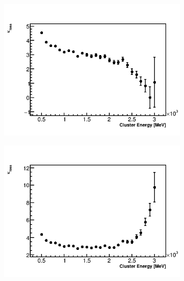 \begin{landscape}
\begin{figure}[h]
    \begin{subfigure}[t]{0.4\textwidth}
        \centering
        \includegraphics[width=\textwidth]{TMethod_kappa_loss_Vs_EBin_Canv_EG-0}
        \caption{}
    \end{subfigure}%
    \hspace{1cm}
    \begin{subfigure}[t]{0.4\textwidth}
        \centering
        \includegraphics[width=\textwidth]{TMethod_kappa_loss_Vs_EBin_Canv_EG-11p2}
        \caption{}
    \end{subfigure}
    \hspace{1cm}
    \begin{subfigure}[t]{0.4\textwidth}

\end{subfigure}
\end{figure}
\end{landscape}
